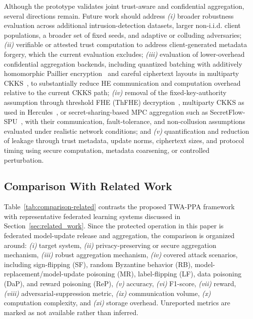 \documentclass[journal]{IEEEtran}
\begin{document}
Although the prototype validates joint trust-aware and confidential aggregation,
several directions remain. Future work should address \emph{(i)} broader
robustness evaluation across additional intrusion-detection datasets, larger
non-i.i.d. client populations, a broader set of fixed seeds, and adaptive or colluding
adversaries; \emph{(ii)} verifiable or attested trust computation to address
client-generated metadata forgery, which the current evaluation excludes;
\emph{(iii)} evaluation of lower-overhead confidential aggregation backends,
including quantized batching with additively homomorphic Paillier
encryption~\cite{zhang2020batchcrypt} and careful ciphertext layouts in multiparty
CKKS~\cite{xuhercules2023}, to substantially reduce HE communication and
computation overhead relative to the current CKKS path;
\emph{(iv)} removal of the fixed-key-authority assumption through threshold
FHE (ThFHE) decryption~\cite{dahl2023noahsark, hu2026ajax}, multiparty CKKS as used in
Hercules~\cite{xuhercules2023}, or secret-sharing-based MPC aggregation such
as SecretFlow-SPU~\cite{ma2023secretflowspu}, with their communication,
fault-tolerance, and non-collusion assumptions evaluated under realistic
network conditions; and \emph{(v)} quantification and reduction of leakage
through trust metadata, update norms, ciphertext sizes, and protocol timing
using secure computation, metadata coarsening, or controlled perturbation.

\subsection{Comparison With Related Work}\label{sec:related_comparison}

Table~\ref{tab:comparison-related} contrasts the proposed TWA-PPA framework
with representative federated learning systems discussed in
Section~\ref{sec:related_work}. Since the protected operation in this paper is
federated model-update release and aggregation, the comparison is organized
around: \emph{(i)} target system, \emph{(ii)} privacy-preserving or secure
aggregation mechanism, \emph{(iii)} robust aggregation mechanism,
\emph{(iv)} covered attack scenarios, including sign-flipping (SF), random
Byzantine behavior (RB), model-replacement/model-update poisoning (MR),
label-flipping (LF), data poisoning (DaP), and reward poisoning (ReP),
\emph{(v)} accuracy, \emph{(vi)} F1-score, \emph{(vii)} reward,
\emph{(viii)} adversarial-suppression metric, \emph{(ix)} communication volume,
\emph{(x)} computation complexity, and \emph{(xi)} storage overhead. Unreported
metrics are marked as not available rather than inferred.
\end{document}
